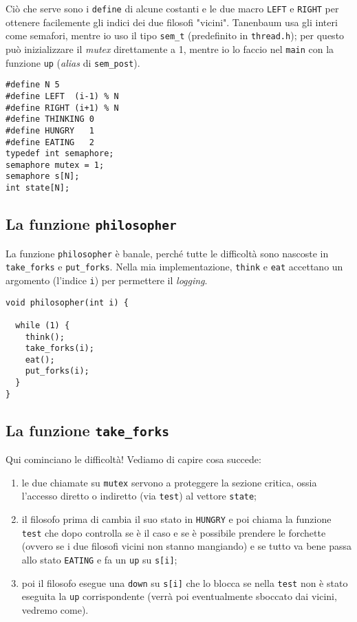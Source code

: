 \documentclass{article}
\begin{document}
Ciò che serve sono i \texttt{define} di alcune costanti e le due macro
\texttt{LEFT} e \texttt{RIGHT} per ottenere facilemente gli indici dei due
filosofi "vicini".  Tanenbaum usa gli interi come semafori, mentre
io uso il tipo \texttt{sem\_t} (predefinito in \texttt{thread.h}); per questo può
inizializzare il \emph{mutex} direttamente a 1, mentre io lo faccio nel
\texttt{main} con la funzione \texttt{up} (\emph{alias} di \texttt{sem\_post}).

\begin{verbatim}
#define N 5
#define LEFT  (i-1) % N
#define RIGHT (i+1) % N
#define THINKING 0
#define HUNGRY   1
#define EATING   2
typedef int semaphore;
semaphore mutex = 1;
semaphore s[N];       
int state[N];
\end{verbatim}

\subsection{La funzione \texttt{philosopher}}
\label{sec-3-2}

La funzione \texttt{philosopher} è banale, perché tutte le difficoltà sono
nascoste in \texttt{take\_forks} e \texttt{put\_forks}.  Nella mia implementazione,
\texttt{think} e \texttt{eat} accettano un argomento (l'indice \texttt{i}) per
permettere il \emph{logging}.

\begin{verbatim}
void philosopher(int i) {

  while (1) {           
    think();
    take_forks(i);
    eat();
    put_forks(i);
  }
}
\end{verbatim}

\subsection{La funzione \texttt{take\_forks}}
\label{sec-3-3}

Qui cominciano le difficoltà! Vediamo di capire cosa succede:

\begin{enumerate}
\item le due chiamate su \texttt{mutex} servono a proteggere la sezione
critica, ossia l'accesso diretto o indiretto (via \texttt{test}) al
vettore \texttt{state};
\item il filosofo prima di cambia il suo stato in \texttt{HUNGRY} e poi
chiama la funzione \texttt{test} che dopo controlla se è il caso e se è
possibile prendere le forchette (ovvero se i due filosofi vicini
non stanno mangiando) e se tutto va bene passa allo stato
\texttt{EATING} e fa un \texttt{up} su \texttt{s[i]};
\item poi il filosofo esegue una \texttt{down} su \texttt{s[i]} che lo blocca se
nella \texttt{test} non è stato eseguita la \texttt{up} corrispondente (verrà
poi eventualmente sboccato dai vicini, vedremo come).
\end{enumerate}
\end{document}
